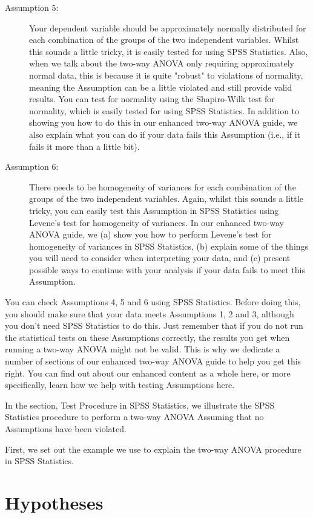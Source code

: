 \documentclass[]{article}
\begin{document}
\begin{description}
\item[ Assumption 5:] Your dependent variable should be approximately normally distributed for each combination of the groups of the two independent variables. Whilst this sounds a little tricky, it is easily tested for using SPSS Statistics. Also, when we talk about the two-way ANOVA only requiring approximately normal data, this is because it is quite "robust" to violations of normality, meaning the Assumption can be a little violated and still provide valid results. You can test for normality using the Shapiro-Wilk test for normality, which is easily tested for using SPSS Statistics. In addition to showing you how to do this in our enhanced two-way ANOVA guide, we also explain what you can do if your data fails this Assumption (i.e., if it fails it more than a little bit).
\item[ Assumption 6:] There needs to be homogeneity of variances for each combination of the groups of the two independent variables. Again, whilst this sounds a little tricky, you can easily test this Assumption in SPSS Statistics using Levene’s test for homogeneity of variances. In our enhanced two-way ANOVA guide, we (a) show you how to perform Levene’s test for homogeneity of variances in SPSS Statistics, (b) explain some of the things you will need to consider when interpreting your data, and (c) present possible ways to continue with your analysis if your data fails to meet this Assumption.
\end{description}
You can check Assumptions 4, 5 and 6 using SPSS Statistics. Before doing this, you should make sure that your data meets Assumptions 1, 2 and 3, although you don’t need SPSS Statistics to do this. Just remember that if you do not run the statistical tests on these Assumptions correctly, the results you get when running a two-way ANOVA might not be valid. This is why we dedicate a number of sections of our enhanced two-way ANOVA guide to help you get this right. You can find out about our enhanced content as a whole here, or more specifically, learn how we help with testing Assumptions here.

In the section, Test Procedure in SPSS Statistics, we illustrate the SPSS Statistics procedure to perform a two-way ANOVA Assuming that no Assumptions have been violated. 

First, we set out the example we use to explain the two-way ANOVA procedure in SPSS Statistics.

\section{Hypotheses}
\end{document}
